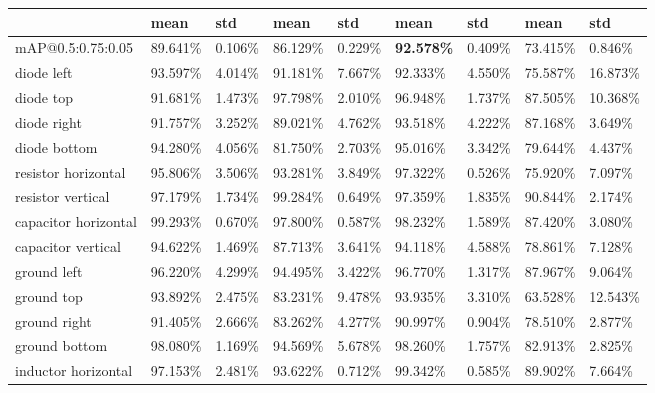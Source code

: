\begin{table}[H]
\begin{center}
\begin{tabular}{|l|l|l|l|l|l|l|l|l|}
\hline
                                & mean     & std      & mean     & std      & mean     & std       & mean     & std      \\
\hline
mAP@0.5:0.75:0.05               & 89.641\% & 0.106\%  & 86.129\% & 0.229\%  &  \textbf{92.578\%}  & 0.409\% & 73.415\% & 0.846\%  \\
\hline
\rowcolor{lightgray!50}
diode left                      & 93.597\% & 4.014\%  & 91.181\% & 7.667\%  &  92.333\%  & 4.550\% & 75.587\% & 16.873\% \\
diode top                       & 91.681\% & 1.473\%  & 97.798\% & 2.010\%  &  96.948\%  & 1.737\% & 87.505\% & 10.368\% \\
\rowcolor{lightgray!50}
diode right                     & 91.757\% & 3.252\%  & 89.021\% & 4.762\%  &  93.518\%  & 4.222\% & 87.168\% & 3.649\%  \\
diode bottom                    & 94.280\% & 4.056\%  & 81.750\% & 2.703\%  &  95.016\%  & 3.342\% & 79.644\% & 4.437\%  \\
\rowcolor{lightgray!50}
resistor horizontal             & 95.806\% & 3.506\%  & 93.281\% & 3.849\%  &  97.322\%  & 0.526\% & 75.920\% & 7.097\%  \\
resistor vertical               & 97.179\% & 1.734\%  & 99.284\% & 0.649\%  &  97.359\%  & 1.835\% & 90.844\% & 2.174\%  \\
\rowcolor{lightgray!50}
capacitor horizontal            & 99.293\% & 0.670\%  & 97.800\% & 0.587\%  &  98.232\%  & 1.589\% & 87.420\% & 3.080\%  \\
capacitor vertical              & 94.622\% & 1.469\%  & 87.713\% & 3.641\%  &  94.118\%  & 4.588\% & 78.861\% & 7.128\%  \\
\rowcolor{lightgray!50}
ground left                     & 96.220\% & 4.299\%  & 94.495\% & 3.422\%  &  96.770\%  & 1.317\% & 87.967\% & 9.064\%  \\
ground top                      & 93.892\% & 2.475\%  & 83.231\% & 9.478\%  &  93.935\%  & 3.310\% & 63.528\% & 12.543\% \\
\rowcolor{lightgray!50}
ground right                    & 91.405\% & 2.666\%  & 83.262\% & 4.277\%  &  90.997\%  & 0.904\% & 78.510\% & 2.877\%  \\
ground bottom                   & 98.080\% & 1.169\%  & 94.569\% & 5.678\%  &  98.260\%  & 1.757\% & 82.913\% & 2.825\%  \\
\rowcolor{lightgray!50}
inductor horizontal             & 97.153\% & 2.481\%  & 93.622\% & 0.712\%  &  99.342\%  & 0.585\% & 89.902\% & 7.664\%  \\

\end{tabular}
\end{center}
\end{table}

